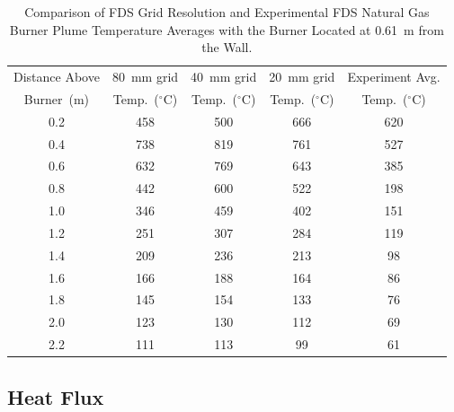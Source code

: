 \documentclass[twoside]{uocthesis}
\begin{document}
\begin{table}
	\small
	\centering
	\begin{tabular}{|c|c|c|c|c|}
		\hline Distance Above  & 80~mm grid      & 40~mm grid     & 20~mm grid 		& Experiment Avg. \\
		Burner~(m)	   & Temp.~($^{\circ}$C) & Temp.~($^{\circ}$C) & Temp.~($^{\circ}$C)  & Temp.~($^{\circ}$C)	\\ \hline
		\hline 0.2 			   & 458						& 500					& 666 			& 620 	\\
		\hline 0.4			   & 738					   	& 819					& 761			& 527 	\\
		\hline 0.6			   & 632						& 769					& 643			& 385 	\\
		\hline 0.8			   & 442						& 600					& 522			& 198	\\
		\hline 1.0			   & 346						& 459 					& 402			& 151	\\
		\hline 1.2			   & 251						& 307 					& 284			& 119	\\
		\hline 1.4			   & 209						& 236 					& 213			& 98	\\
		\hline 1.6			   & 166						& 188 					& 164			& 86	\\
		\hline 1.8			   & 145						& 154 					& 133			& 76	\\
		\hline 2.0			   & 123						& 130 					& 112			& 69	\\
		\hline 2.2			   & 111						& 113 					& 99			& 61	\\
		\hline
	\end{tabular}
	\caption[Comparison of FDS Grid Resolution and Experimental FDS Natural Gas Burner Plume Temperatures]{Comparison of FDS Grid Resolution and Experimental FDS Natural Gas Burner Plume Temperature Averages with the Burner Located at 0.61~m from the Wall.}
	\label{tab:FDSRI_Exp_Plume}
\end{table}


\subsection{Heat Flux}
\end{document}
